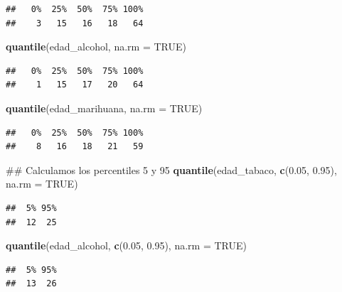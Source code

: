 \documentclass[spanish,]{book}
\newenvironment{Shaded}{\begin{snugshade}}{\end{snugshade}}
\newcommand{\KeywordTok}[1]{\textcolor[rgb]{0.13,0.29,0.53}{\textbf{#1}}}
\newcommand{\DataTypeTok}[1]{\textcolor[rgb]{0.13,0.29,0.53}{#1}}
\newcommand{\FloatTok}[1]{\textcolor[rgb]{0.00,0.00,0.81}{#1}}
\newcommand{\OtherTok}[1]{\textcolor[rgb]{0.56,0.35,0.01}{#1}}
\newcommand{\NormalTok}[1]{#1}
\begin{document}
\begin{verbatim}
##   0%  25%  50%  75% 100% 
##    3   15   16   18   64
\end{verbatim}

\begin{Shaded}
\begin{Highlighting}[]
\KeywordTok{quantile}\NormalTok{(edad_alcohol, }\DataTypeTok{na.rm =} \OtherTok{TRUE}\NormalTok{)}
\end{Highlighting}
\end{Shaded}

\begin{verbatim}
##   0%  25%  50%  75% 100% 
##    1   15   17   20   64
\end{verbatim}

\begin{Shaded}
\begin{Highlighting}[]
\KeywordTok{quantile}\NormalTok{(edad_marihuana, }\DataTypeTok{na.rm =} \OtherTok{TRUE}\NormalTok{)}
\end{Highlighting}
\end{Shaded}

\begin{verbatim}
##   0%  25%  50%  75% 100% 
##    8   16   18   21   59
\end{verbatim}

\begin{Shaded}
\begin{Highlighting}[]
\NormalTok{## Calculamos los percentiles 5 y 95}
\KeywordTok{quantile}\NormalTok{(edad_tabaco, }\KeywordTok{c}\NormalTok{(}\FloatTok{0.05}\NormalTok{, }\FloatTok{0.95}\NormalTok{), }\DataTypeTok{na.rm =} \OtherTok{TRUE}\NormalTok{)}
\end{Highlighting}
\end{Shaded}

\begin{verbatim}
##  5% 95% 
##  12  25
\end{verbatim}

\begin{Shaded}
\begin{Highlighting}[]
\KeywordTok{quantile}\NormalTok{(edad_alcohol, }\KeywordTok{c}\NormalTok{(}\FloatTok{0.05}\NormalTok{, }\FloatTok{0.95}\NormalTok{), }\DataTypeTok{na.rm =} \OtherTok{TRUE}\NormalTok{)}
\end{Highlighting}
\end{Shaded}

\begin{verbatim}
##  5% 95% 
##  13  26
\end{verbatim}
\end{document}
